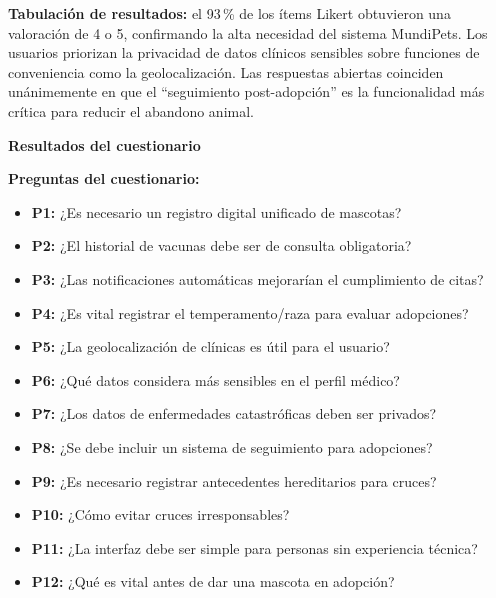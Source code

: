 \documentclass[journal,onecolumn]{IEEEtran}
\begin{document}
\textbf{Tabulación de resultados:} el 93\,\% de los ítems Likert obtuvieron
una valoración de 4 o 5, confirmando la alta necesidad del sistema
MundiPets. Los usuarios priorizan la privacidad de datos clínicos sensibles
sobre funciones de conveniencia como la geolocalización. Las respuestas
abiertas coinciden unánimemente en que el ``seguimiento post-adopción'' es
la funcionalidad más crítica para reducir el abandono animal.

\textbf{Resultados del cuestionario}

\noindent\textbf{Preguntas del cuestionario:}
\begin{itemize}[leftmargin=*, noitemsep]
	\item \textbf{P1:} ¿Es necesario un registro digital unificado de mascotas?
	\item \textbf{P2:} ¿El historial de vacunas debe ser de consulta obligatoria?
	\item \textbf{P3:} ¿Las notificaciones automáticas mejorarían el cumplimiento de citas?
	\item \textbf{P4:} ¿Es vital registrar el temperamento/raza para evaluar adopciones?
	\item \textbf{P5:} ¿La geolocalización de clínicas es útil para el usuario?
	\item \textbf{P6:} ¿Qué datos considera más sensibles en el perfil médico?
	\item \textbf{P7:} ¿Los datos de enfermedades catastróficas deben ser privados?
	\item \textbf{P8:} ¿Se debe incluir un sistema de seguimiento para adopciones?
	\item \textbf{P9:} ¿Es necesario registrar antecedentes hereditarios para cruces?
	\item \textbf{P10:} ¿Cómo evitar cruces irresponsables?
	\item \textbf{P11:} ¿La interfaz debe ser simple para personas sin experiencia técnica?
	\item \textbf{P12:} ¿Qué es vital antes de dar una mascota en adopción?
\end{itemize}

\vspace{0.5em}
\end{document}
